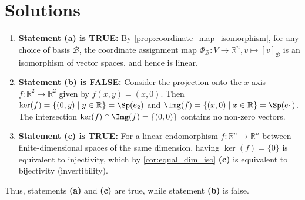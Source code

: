 \section{Solutions}\label{sec:solutions_linear_maps_and_bases}

\begin{exercisesolution*}
\label{sol:properties_coordinate_maps_mc}
\begin{enumerate}[label=\textbf{(\alph*)}]
    \item \textbf{Statement (a) is TRUE:}
    By \cref{prop:coordinate_map_isomorphism}, for any choice of basis $\mathcal{B}$, the coordinate assignment map $\Phi_{\mathcal{B}} \colon V \to \mathbb{R}^n, v \mapsto [v]_{\mathcal{B}}$ is an isomorphism of vector spaces, and hence is linear.

    \item \textbf{Statement (b) is FALSE:}
    Consider the projection onto the $x$-axis $f \colon \mathbb{R}^2 \to \mathbb{R}^2$ given by $f(x, y) = (x, 0)$.
    Then $\ker(f) = \{(0, y) \mid y \in \mathbb{R}\} = \Sp(e_2)$ and $\Img(f) = \{(x, 0) \mid x \in \mathbb{R}\} = \Sp(e_1)$.
    The intersection $\ker(f) \cap \Img(f) = \{(0, 0)\}$ contains no non-zero vectors.

    \item \textbf{Statement (c) is TRUE:}
    For a linear endomorphism $f \colon \mathbb{R}^n \to \mathbb{R}^n$ between finite-di\-men\-sional spaces of the same dimension, having $\ker(f) = \{0\}$ is equivalent to injectivity, which by \cref{cor:equal_dim_iso} \textbf{(c)} is equivalent to bijectivity (invertibility).
\end{enumerate}
Thus, statements \textbf{(a)} and \textbf{(c)} are true, while statement \textbf{(b)} is false.
\end{exercisesolution*}

